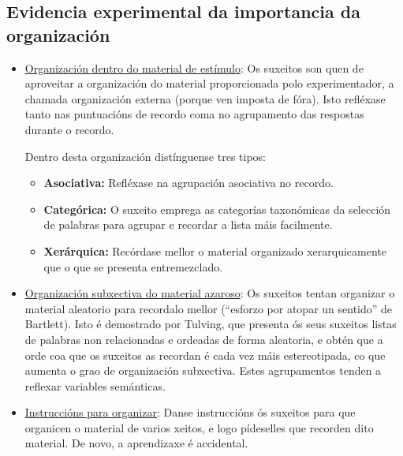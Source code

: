 \documentclass[a4paper,11pt]{article}
\begin{document}
\subsection{Evidencia experimental da importancia da organización}
\begin{itemize}
	\item \underline{Organización dentro do material de estímulo}: Os suxeitos son quen de aproveitar
	a organización do material proporcionada polo experimentador, a chamada organización externa
	(porque ven imposta de fóra). Isto refléxase tanto nas puntuacións de recordo coma no agrupamento
	das respostas durante o recordo.
	 
	Dentro desta organización distínguense tres tipos:
	\begin{itemize}
		\item \textbf{Asociativa:} Refléxase na agrupación asociativa no recordo.
		\item \textbf{Categórica:} O suxeito emprega as categorías taxonómicas da selección de
		palabras para agrupar e recordar a lista máis facilmente.
		\item \textbf{Xerárquica:} Recórdase mellor o material organizado xerarquicamente que o que
		se presenta entremezclado.
	\end{itemize}
	\item \underline{Organización subxectiva do material azaroso}: Os suxeitos tentan organizar o
	material aleatorio para recordalo mellor (``esforzo por atopar un sentido'' de Bartlett). Isto
	é demostrado por Tulving, que presenta ós seus suxeitos listas de palabras non relacionadas e
	ordeadas de forma aleatoria, e obtén que a orde coa que os suxeitos as recordan é cada vez máis
	estereotipada, co que aumenta o grao de organización subxectiva. Estes agrupamentos tenden a 			reflexar variables semánticas.
	\item \underline{Instruccións para organizar}: Danse instruccións ós suxeitos para que organicen
	o material de varios xeitos, e logo pídeselles que recorden dito material. De novo, a aprendizaxe
	é accidental.
	

\end{itemize}
\end{document}
